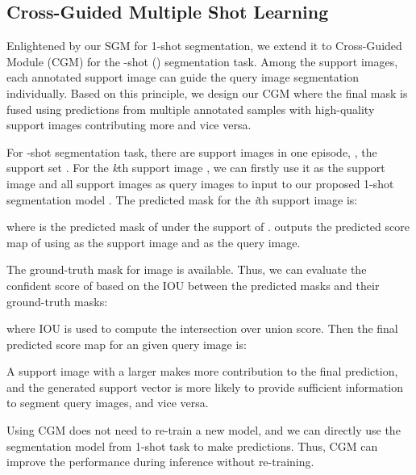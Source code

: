 \documentclass[final]{cvpr}
\begin{document}
\subsection{Cross-Guided Multiple Shot Learning }
Enlightened by our SGM for 1-shot segmentation, we extend it to Cross-Guided Module (CGM) for the -shot () segmentation task. Among the  support images, each annotated support image can guide the query image segmentation individually. Based on this principle, we design our CGM where the final mask is fused using predictions from multiple annotated samples with high-quality support images contributing more and vice versa. 

For -shot segmentation task, there are  support images in one episode, \ie, the support set . For the \emph{k}th support image , we can firstly use it as the support image and all  support images as query images to input to our proposed 1-shot segmentation model . The predicted mask for the \emph{i}th support image  is:
 
where  is the predicted mask of  under the support of .  outputs the predicted score map of  using  as the support image and  as the query image. 

The ground-truth mask  for image  is available. Thus, we can evaluate the confident score of  based on the IOU between the predicted masks and their ground-truth masks: 
 
where IOU is used to compute the intersection over union score. Then the final predicted score map for an given query image  is:
 

A support image with a larger  makes more contribution to the final prediction, and the generated support vector is more likely to provide sufficient information to segment query images, and vice versa. 

Using CGM does not need to re-train a new model, and we can directly use the segmentation model from 1-shot task to make predictions. Thus, CGM can improve the performance during inference without re-training. 
\end{document}
